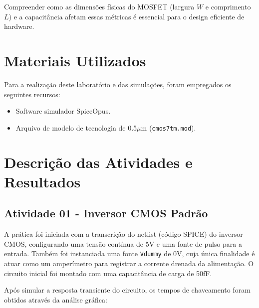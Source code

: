 \documentclass[conference]{IEEEtran}
\begin{document}
Compreender como as dimensões físicas do MOSFET (largura $W$ e comprimento $L$) e a capacitância afetam essas métricas é essencial para o design eficiente de hardware.

\section{Materiais Utilizados}
Para a realização deste laboratório e das simulações, foram empregados os seguintes recursos:
\begin{itemize}
    \item Software simulador SpiceOpus.
    \item Arquivo de modelo de tecnologia de 0.5$\mu$m (\texttt{cmos7tm.mod}).
\end{itemize}

\section{Descrição das Atividades e Resultados}

\subsection{Atividade 01 - Inversor CMOS Padrão}
A prática foi iniciada com a transcrição do netlist (código SPICE) do inversor CMOS, configurando uma tensão contínua de 5V e uma fonte de pulso para a entrada. Também foi instanciada uma fonte \texttt{Vdummy} de 0V, cuja única finalidade é atuar como um amperímetro para registrar a corrente drenada da alimentação. O circuito inicial foi montado com uma capacitância de carga de 50fF.

Após simular a resposta transiente do circuito, os tempos de chaveamento foram obtidos através da análise gráfica:
\end{document}
